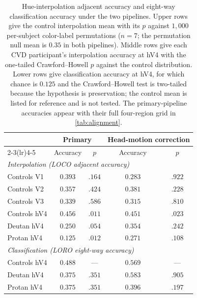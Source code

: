 \begin{table}[h]
\centering
\caption{Hue-interpolation adjacent accuracy and eight-way classification accuracy under the two pipelines. Upper rows give the control interpolation mean with its $p$ against $1{,}000$ per-subject color-label permutations ($n = 7$; the permutation null mean is $0.35$ in both pipelines). Middle rows give each CVD participant's interpolation accuracy at hV4 with the one-tailed Crawford--Howell $p$ against the control distribution. Lower rows give classification accuracy at hV4, for which chance is $0.125$ and the Crawford--Howell test is two-tailed because the hypothesis is preservation; the control mean is listed for reference and is not tested. The primary-pipeline accuracies appear with their full four-region grid in \cref{tab:alignment}.}
\label{tab:interp_arms}
\begin{tabular}{lcccc}
\toprule
 & \multicolumn{2}{c}{Primary} & \multicolumn{2}{c}{Head-motion correction} \\
\cmidrule(lr){2-3}\cmidrule(lr){4-5}
 & Accuracy & $p$ & Accuracy & $p$ \\
\midrule
\multicolumn{5}{l}{\emph{Interpolation (LOCO adjacent accuracy)}} \\
Controls V1  & $0.393$ & $.164$ & $0.283$ & $.922$ \\
Controls V2  & $0.357$ & $.424$ & $0.381$ & $.228$ \\
Controls V3  & $0.339$ & $.586$ & $0.315$ & $.810$ \\
Controls hV4 & $0.456$ & $.011$ & $0.451$ & $.023$ \\
Deutan hV4 & $0.250$ & $.054$ & $0.354$ & $.242$ \\
Protan hV4 & $0.125$ & $.012$ & $0.271$ & $.108$ \\
\midrule
\multicolumn{5}{l}{\emph{Classification (LORO eight-way accuracy)}} \\
Controls hV4 & $0.488$ & --- & $0.569$ & --- \\
Deutan hV4 & $0.375$ & $.351$ & $0.583$ & $.905$ \\
Protan hV4 & $0.375$ & $.351$ & $0.396$ & $.197$ \\
\bottomrule
\end{tabular}
\end{table}

